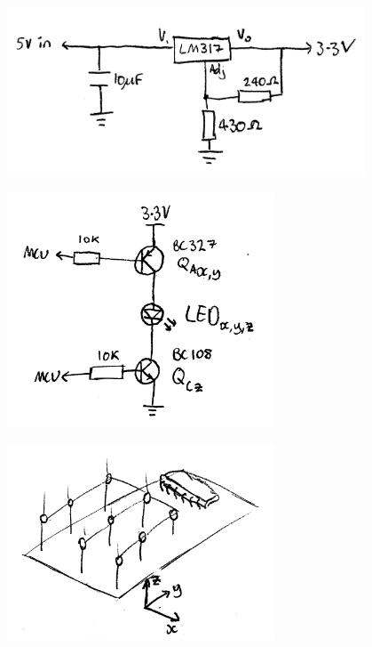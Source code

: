 \documentclass{article}
\begin{document}
\centerline{
\includegraphics[width=0.8\textwidth]{pwr.JPG}
}

\centerline{
\includegraphics[width=0.6\textwidth]{led.JPG}
}

\centerline{
\includegraphics[width=0.6\textwidth]{coordinates.JPG}
}

				
\end{document}
